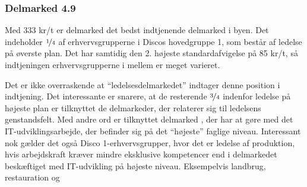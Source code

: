 



%
\subsubsection{Delmarked 4.9}
%

Med 333 kr/t er delmarked  det bedst indtjenende delmarked i byen. Det indeholder $\nicefrac{1}{4}$ af erhvervsgrupperne i Discos hovedgruppe 1, som består af ledelse på øverste plan. Det har samtidig den 2. højeste standardafvigelse på 85 kr/t, så indtjeningen erhvervsgrupperne i mellem er meget varieret.  


Det er ikke overraskende at “ledelsesdelmarkedet” indtager denne position i indtjening. Det interessante er snarere, at de  resterende $\nicefrac{3}{4}$ indenfor ledelse på højeste plan er tilknyttet de delmarkeder, der relaterer sig til ledelsens genstandsfelt. Med andre ord er  tilknyttet delmarked , der har at gøre med det IT-udviklingsarbejde, der befinder sig på det “højeste” faglige niveau. Interessant nok gælder det også Disco 1-erhvervsgrupper, hvor det er ledelse af produktion, hvis arbejdskraft kræver mindre eksklusive kompetencer end i delmarkedet beskæftiget med IT-udvikling på højeste niveau. Eksempelvis landbrug, restauration og  %



